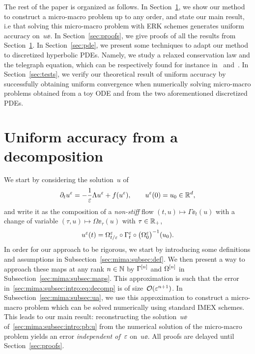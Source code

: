 The rest of the paper is organized as follows. In Section~\ref{sec:mima},
we show our method to construct a micro-macro problem up to any order, and
state our main result, i.e that solving this micro-macro problem with ERK
schemes generates uniform accuracy on~$u\ee$. In Section~\ref{sec:proofs},
we give proofs of all the results from Section~\ref{sec:mima}. In
Section~\ref{sec:pde}, we present some techniques to adapt our method to
discretized hyperbolic PDEs. Namely, we study a relaxed conservation law
and the telegraph equation, which can be respectively found for instance
in~\cite{jin.1995.relaxation} and~\cite{lemou.2008.new}. 
%
In Section~\ref{sec:tests}, we verify our theoretical result of uniform
accuracy by successfully obtaining uniform convergence when numerically
solving micro-macro problems obtained from a toy ODE and from the two
aforementioned discretized PDEs. 







\section{Uniform accuracy from a decomposition} \label{sec:mima}

We start by considering the solution~$u$ of
\begin{equation} \label{sec:mima:subsec:intro:pb:u}
    \partial_t u^{\varepsilon} = -\frac{1}{\varepsilon} \Lambda u^{\varepsilon} + f(u^{\varepsilon}), 
    \qquad
    u^{\varepsilon}(0) = u_0 \in \mathbb{R}^d , 
\end{equation}
and write it as the composition of a \textit{non-stiff} flow $(t,u) \mapsto \Gamma\ee_t(u)$ 
with a change of variable $(\tau, u) \mapsto \Omega\ee_{\tau}(u)$ with $\tau \in \mathbb{R}_+$,
\begin{equation} \label{sec:mima:subsec:intro:eq:decomp}
    u^{\varepsilon}(t) = \Omega^{\varepsilon}_{t/\varepsilon} \circ \Gamma^{\varepsilon}_t \circ \big( \Omega^{\varepsilon}_0 \big)^{-1} (u_0) . 
\end{equation}
In order for our approach to be rigorous, we start by introducing some 
definitions and assumptions in Subsection~\ref{sec:mima:subsec:def}. 
We then present a way to approach these maps at any rank $n \in \mathbb{N}$ 
by $\Gamma^{[n]}$ and $\Omega^{[n]}$  in Subsection~\ref{sec:mima:subsec:maps}.
This approximation is such that the error 
in~\eqref{sec:mima:subsec:intro:eq:decomp} is of size~$\mathcal{O}(\varepsilon^{n+1})$. 
In Subsection~\ref{sec:mima:subsec:ua}, we use this approximation to construct a micro-macro problem which can be solved numerically using standard IMEX schemes. 
%
This leads to our main result: 
reconstructing the solution~$u\ee$ of~\eqref{sec:mima:subsec:intro:pb:u} 
from the numerical solution of the micro-macro problem 
yields an error \textit{independent of}~$\varepsilon$ on~$u\ee$. 
All proofs are delayed until Section~\ref{sec:proofs}.




